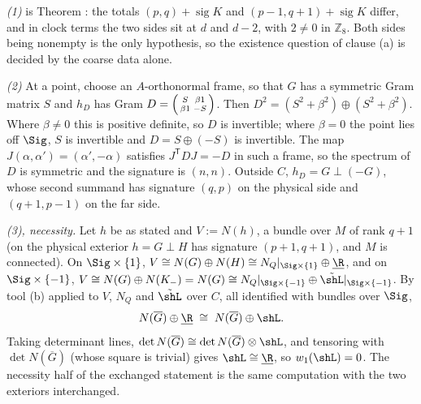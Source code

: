 \emph{(1)} is Theorem : the totals $(p,q) + \operatorname{sig}K$ and $(p{-}1,q{+}1) + \operatorname{sig}K$ differ, and in clock terms the two sides sit at $d$ and $d - 2$, with $2 \neq 0$ in $\mathbb{Z}_8$. Both sides being nonempty is the only hypothesis, so the existence question of clause (a) is decided by the coarse data alone.

\emph{(2)} At a point, choose an $A$-orthonormal frame, so that $G$ has a symmetric Gram matrix $S$ and $h_D$ has Gram $D = \begin{psmallmatrix} S & \beta 1 \\ \beta 1 & -S \end{psmallmatrix}$. Then $D^2 = (S^2 + \beta^2) \oplus (S^2 + \beta^2)$. Where $\beta \neq 0$ this is positive definite, so $D$ is invertible; where $\beta = 0$ the point lies off $\Sig$, $S$ is invertible and $D = S \oplus (-S)$ is invertible. The map $J(\alpha,\alpha') = (\alpha', -\alpha)$ satisfies $J^{\mathsf T} D J = -D$ in such a frame, so the spectrum of $D$ is symmetric and the signature is $(n,n)$. Outside $C$, $h_D = G \perp (-G)$, whose second summand has signature $(q,p)$ on the physical side and $(q{+}1,p{-}1)$ on the far side.

\emph{(3), necessity.} Let $h$ be as stated and $V := N(h)$, a bundle over $M$ of rank $q + 1$ (on the physical exterior $h = G \perp H$ has signature $(p{+}1,q{+}1)$, and $M$ is connected). On $\Sig \times \{1\}$, $V \cong N(G) \oplus N(H) \cong N_Q|_{\Sig \times \{1\}} \oplus \underline{\R}$, and on $\Sig \times \{-1\}$, $V \cong N(G) \oplus N(K_-) = N(G) \cong N_Q|_{\Sig \times \{-1\}} \oplus \tilde\shL|_{\Sig \times \{-1\}}$. By tool (b) applied to $V$, $N_Q$ and $\tilde\shL$ over $C$, all identified with bundles over $\Sig$,
\[
N(\overline G) \oplus \underline{\R} \;\cong\; N(\overline G) \oplus \shL .
\]
Taking determinant lines, $\det N(\overline G) \cong \det N(\overline G) \otimes \shL$, and tensoring with $\det N(\overline G)$ (whose square is trivial) gives $\shL \cong \underline{\R}$, so $w_1(\shL) = 0$. The necessity half of the exchanged statement is the same computation with the two exteriors interchanged.

